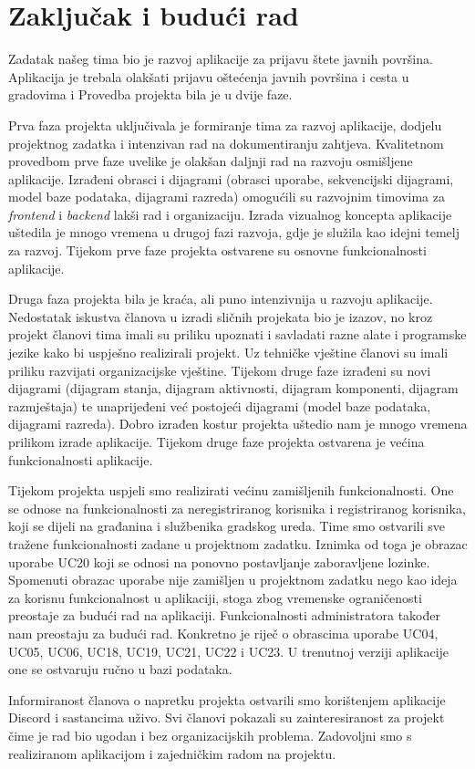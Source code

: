 \chapter{Zaključak i budući rad}
		
		Zadatak našeg tima bio je razvoj aplikacije za prijavu štete javnih površina. Aplikacija je trebala olakšati 
		prijavu oštećenja javnih površina i cesta u gradovima i Provedba projekta bila je u dvije faze.

		Prva faza projekta uključivala je formiranje tima za razvoj aplikacije, dodjelu projektnog zadatka i intenzivan
		rad na dokumentiranju zahtjeva. Kvalitetnom provedbom prve faze uvelike je olakšan daljnji rad na razvoju 
		osmišljene aplikacije. Izrađeni obrasci i dijagrami (obrasci uporabe, sekvencijski dijagrami, model baze podataka,
		dijagrami razreda) omogućili su razvojnim timovima za \textit{frontend} i \textit{backend} lakši rad i organizaciju.
		Izrada vizualnog koncepta aplikacije uštedila je mnogo vremena u drugoj fazi razvoja, gdje je služila kao idejni 
		temelj za razvoj. Tijekom prve faze projekta ostvarene su osnovne funkcionalnosti aplikacije.

		Druga faza projekta bila je kraća, ali puno intenzivnija u razvoju aplikacije. Nedostatak iskustva članova u izradi
		sličnih projekata bio je izazov, no kroz projekt članovi tima imali su priliku upoznati i savladati razne alate i 
		programske jezike kako bi uspješno realizirali projekt. Uz tehničke vještine članovi su imali priliku razvijati 
		organizacijske vještine. Tijekom druge faze izrađeni su novi dijagrami (dijagram stanja, dijagram aktivnosti, dijagram
		komponenti, dijagram razmještaja) te unaprijeđeni već postojeći dijagrami (model baze podataka, dijagrami razreda).
		Dobro izrađen kostur projekta uštedio nam je mnogo vremena prilikom izrade aplikacije. Tijekom druge faze projekta ostvarena 
		je većina funkcionalnosti aplikacije.

		Tijekom projekta uspjeli smo realizirati većinu zamišljenih funkcionalnosti. One se odnose na funkcionalnosti za 
		neregistriranog korisnika i registriranog korisnika, koji se dijeli na građanina i službenika gradskog ureda. Time 
		smo ostvarili sve tražene funkcionalnosti zadane u projektnom zadatku. Iznimka od toga je obrazac uporabe UC20 koji se 
		odnosi na ponovno postavljanje zaboravljene lozinke. Spomenuti obrazac uporabe nije zamišljen u projektnom zadatku nego
		kao ideja za korisnu funkcionalnost u aplikaciji, stoga zbog vremenske ograničenosti preostaje za budući rad na aplikaciji.
		Funkcionalnosti administratora također nam preostaju za budući rad. Konkretno je riječ o obrascima uporabe UC04, UC05,
		UC06, UC18, UC19, UC21, UC22 i UC23. U trenutnoj verziji aplikacije one se ostvaruju ručno u bazi podataka. 

		Informiranost članova o napretku projekta ostvarili smo korištenjem aplikacije Discord i sastancima uživo. Svi 
		članovi pokazali su zainteresiranost za projekt čime je rad bio ugodan i bez organizacijskih problema. Zadovoljni smo s
		realiziranom aplikacijom i zajedničkim radom na projektu.

		\eject 